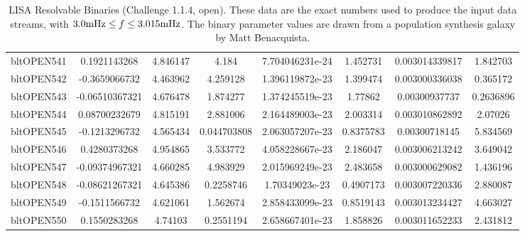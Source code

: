 \documentclass[11pt]{report}
\begin{document}
\begin{sidewaystable}
{\begin{tabular}{|l|c|c|c|c|c|c|c|}
    bltOPEN541   &  0.1921143268   &      4.846147   &         4.184   & 7.704046231e-24   &      1.452731   & 0.003014339817   &      1.842703\\
    bltOPEN542   & -0.3659066732   &      4.463962   &      4.259128   & 1.396119872e-23   &      1.399474   & 0.003000336038   &      0.365172\\
    bltOPEN543   & -0.06510367321   &      4.676478   &      1.874277   & 1.374245519e-23   &       1.77862   & 0.00300937737   &     0.2636896\\
    bltOPEN544   & 0.08700232679   &      4.815191   &      2.881006   & 2.164489003e-23   &      2.003314   & 0.003010862892   &       2.07026\\
    bltOPEN545   & -0.1213296732   &      4.565434   &   0.044703808   & 2.063057207e-23   &     0.8375783   & 0.00300718145   &      5.834569\\
    bltOPEN546   &  0.4280373268   &      4.954865   &      3.533772   & 4.058228667e-23   &      2.186047   & 0.003006213242   &      3.649042\\
    bltOPEN547   & -0.09374967321   &      4.660285   &      4.983929   & 2.015969249e-23   &      2.483658   & 0.003000629082   &      1.436196\\
    bltOPEN548   & -0.08621267321   &      4.645386   &     0.2258746   & 1.70349023e-23   &     0.4907173   & 0.003007220336   &      2.880087\\
    bltOPEN549   & -0.1511566732   &      4.621061   &      1.562674   & 2.858433099e-23   &     0.8519143   & 0.003013234427   &      4.663027\\
    bltOPEN550   &  0.1550283268   &       4.74103   &     0.2551194   & 2.658667401e-23   &      1.858826   & 0.003011652233   &      2.431812\\
    \hline
    \end{tabular}
    \label{tbl.LISAbinaries1.1.4}
        \caption{LISA Resolvable Binaries (Challenge 1.1.4, open).  These data are the exact numbers
        used to produce the input data streams, with $3.0  {\rm mHz} \leq f \leq 3.015 {\rm mHz}$.
        The binary parameter values are drawn from a
        population synthesis galaxy by Matt Benacquista.}
}
\end{sidewaystable}




\begin{thebibliography}{}

\end{thebibliography}
\end{document}
